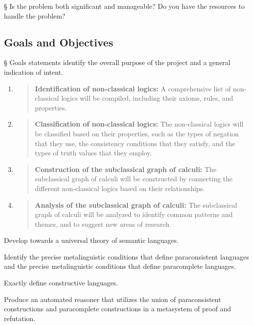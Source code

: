 § Is the problem both significant and manageable? Do you have the
resources to handle the problem?

\hypertarget{goals-and-objectives}{%
\subsection{Goals and Objectives}\label{goals-and-objectives}}

§ Goals statements identify the overall purpose of the project and a
general indication of intent.

\begin{enumerate}
\def\labelenumi{\arabic{enumi}.}
\item
  \begin{quote}
  \textbf{Identification of non-classical logics:} A comprehensive list
  of non-classical logics will be compiled, including their axioms,
  rules, and properties.
  \end{quote}
\item
  \begin{quote}
  \textbf{Classification of non-classical logics:} The non-classical
  logics will be classified based on their properties, such as the types
  of negation that they use, the consistency conditions that they
  satisfy, and the types of truth values that they employ.
  \end{quote}
\item
  \begin{quote}
  \textbf{Construction of the subclassical graph of calculi:} The
  subclassical graph of calculi will be constructed by connecting the
  different non-classical logics based on their relationships.
  \end{quote}
\item
  \begin{quote}
  \textbf{Analysis of the subclassical graph of calculi:} The
  subclassical graph of calculi will be analyzed to identify common
  patterns and themes, and to suggest new areas of research.
  \end{quote}
\end{enumerate}

Develop towards a universal theory of semantic languages.

Identify the precise metalinguistic conditions that define
paraconsistent languages and the precise metalinguistic conditions that
define paracomplete languages.

Exactly define constructive languages.

Produce an automated reasoner that utilizes the union of paraconsistent
constructions and paracomplete constructions in a metasystem of proof
and refutation.

